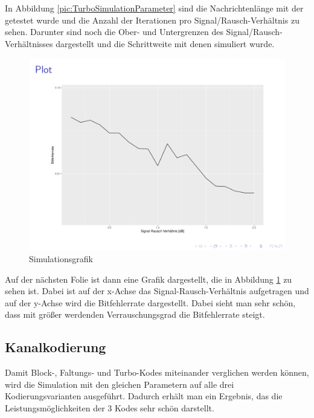 In Abbildung \ref{pic:TurboSimulationParameter} sind die Nachrichtenlänge mit der getestet wurde und die Anzahl der Iterationen pro Signal/Rausch-Verhältnis zu sehen. Darunter sind noch die Ober- und Untergrenzen des Signal/Rausch-Verhältnisses dargestellt und die Schrittweite mit denen simuliert wurde.

\begin{figure}[!ht]
\centering
\includegraphics[width=\ScaleIfNeeded]{pictures/SimulationTurbo2}
\caption{Simulationsgrafik}
\label{pic:TurboSimulationPlot}
\end{figure}

Auf der nächsten Folie ist dann eine Grafik dargestellt, die in Abbildung \ref{pic:TurboSimulationPlot} zu sehen ist. Dabei ist auf der x-Achse das Signal-Rausch-Verhältnis aufgetragen und auf der y-Achse wird die Bitfehlerrate dargestellt. Dabei sieht man sehr schön, dass mit größer werdenden Verrauschungsgrad die Bitfehlerrate steigt.

\subsection{Kanalkodierung}
\label{sec:visualization_simulations_channelcoding}
Damit Block-, Faltungs- und Turbo-Kodes miteinander verglichen werden können, wird die Simulation mit den gleichen Parametern auf alle drei Kodierungsvarianten ausgeführt. Dadurch erhält man ein Ergebnis, das die Leistungsmöglichkeiten der 3 Kodes sehr schön darstellt.

